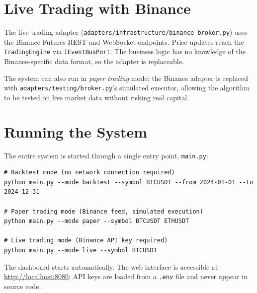 \section{Live Trading with Binance}
\label{sec:live_trading}

The live trading adapter (\texttt{adapters/infrastructure/binance\_broker.py})
uses the Binance Futures REST and WebSocket endpoints. Price updates reach the
\texttt{TradingEngine} via \texttt{IEventBusPort}. The business logic has no
knowledge of the Binance-specific data format, so the adapter is replaceable.


The system can also run in \emph{paper trading} mode: the Binance adapter is
replaced with \texttt{adapters/testing/broker.py}'s simulated executor,
allowing the algorithm to be tested on live market data without risking real
capital.

\section{Running the System}
\label{sec:running}

The entire system is started through a single entry point, \texttt{main.py}:

\begin{verbatim}
# Backtest mode (no network connection required)
python main.py --mode backtest --symbol BTCUSDT --from 2024-01-01 --to 2024-12-31

# Paper trading mode (Binance feed, simulated execution)
python main.py --mode paper --symbol BTCUSDT ETHUSDT

# Live trading mode (Binance API key required)
python main.py --mode live --symbol BTCUSDT
\end{verbatim}

The dashboard starts automatically. The web interface is accessible at
\url{http://localhost:8080}; API keys are loaded from a \texttt{.env} file
and never appear in source code.

